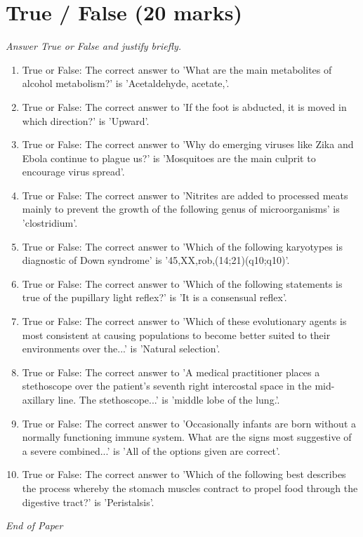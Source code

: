 \documentclass[12pt]{article}
\begin{document}
\section*{True / False (20 marks)}
\textit{Answer True or False and justify briefly.}
\begin{enumerate}[label=\arabic*.]
\item True or False: The correct answer to 'What are the main metabolites of alcohol metabolism?' is 'Acetaldehyde, acetate,'.
\item True or False: The correct answer to 'If the foot is abducted, it is moved in which direction?' is 'Upward'.
\item True or False: The correct answer to 'Why do emerging viruses like Zika and Ebola continue to plague us?' is 'Mosquitoes are the main culprit to encourage virus spread'.
\item True or False: The correct answer to 'Nitrites are added to processed meats mainly to prevent the growth of the following genus of microorganisms' is 'clostridium'.
\item True or False: The correct answer to 'Which of the following karyotypes is diagnostic of Down syndrome' is '45,XX,rob,(14;21)(q10;q10)'.
\item True or False: The correct answer to 'Which of the following statements is true of the pupillary light reflex?' is 'It is a consensual reflex'.
\item True or False: The correct answer to 'Which of these evolutionary agents is most consistent at causing populations to become better suited to their environments over the...' is 'Natural selection'.
\item True or False: The correct answer to 'A medical practitioner places a stethoscope over the patient's seventh right intercostal space in the mid-axillary line. The stethoscope...' is 'middle lobe of the lung.'.
\item True or False: The correct answer to 'Occasionally infants are born without a normally functioning immune system. What are the signs most suggestive of a severe combined...' is 'All of the options given are correct'.
\item True or False: The correct answer to 'Which of the following best describes the process whereby the stomach muscles contract to propel food through the digestive tract?' is 'Peristalsis'.
\end{enumerate}

\vfill
\noindent\textit{End of Paper}
\end{document}
